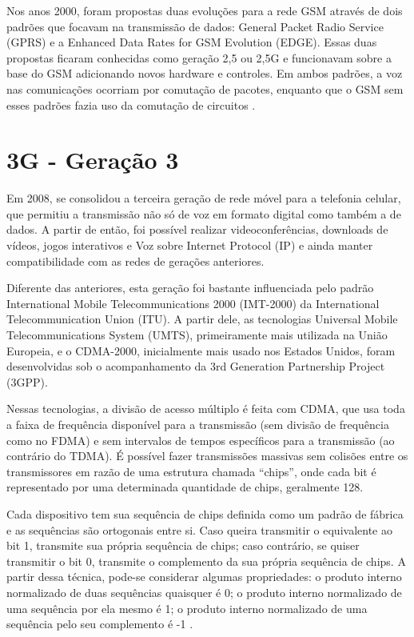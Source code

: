\documentclass[11pt,oneside,a4paper]{abntex2}
\begin{document}
Nos anos 2000, foram propostas duas evoluções para a rede GSM através de dois padrões que focavam na transmissão de dados: General Packet Radio Service (GPRS) e a Enhanced Data Rates for GSM Evolution (EDGE). Essas duas propostas ficaram conhecidas como geração 2,5 ou 2,5G e funcionavam sobre a base do GSM adicionando novos hardware e controles. Em ambos padrões, a voz nas comunicações ocorriam por comutação de pacotes, enquanto que o GSM sem esses padrões fazia uso da comutação de circuitos \cite{tcc2}.

\section*{3G - Geração 3}
\label{3g}

Em 2008, se consolidou a terceira geração de rede móvel para a telefonia celular, que permitiu a transmissão não só de voz em formato digital como também a de dados. A partir de então, foi possível realizar videoconferências, downloads de vídeos, jogos interativos e Voz sobre Internet Protocol (IP) \cite{tcc1} e ainda manter compatibilidade com as redes de gerações anteriores.

Diferente das anteriores, esta geração foi bastante influenciada pelo padrão International Mobile Telecommunications 2000 (IMT-2000) da International Telecommunication Union (ITU). A partir dele, as tecnologias Universal Mobile Telecommunications System (UMTS), primeiramente mais utilizada na União Europeia, e o CDMA-2000, inicialmente mais usado nos Estados Unidos, foram desenvolvidas sob o acompanhamento da 3rd Generation Partnership Project (3GPP).

Nessas tecnologias, a divisão de acesso múltiplo é feita com CDMA, que usa toda a faixa de frequência disponível para a transmissão (sem divisão de frequência como no FDMA) e sem intervalos de tempos específicos para a transmissão (ao contrário do TDMA). É possível fazer transmissões massivas sem colisões entre os transmissores em razão de  uma estrutura chamada ``chips'', onde cada bit é representado por uma determinada quantidade de chips, geralmente 128.

Cada dispositivo tem sua sequência de chips definida como um padrão de fábrica e as sequências são ortogonais entre si. Caso queira transmitir o equivalente ao bit 1, transmite sua própria sequência de chips; caso contrário, se quiser transmitir o bit 0, transmite o complemento da sua própria sequência de chips. A partir dessa técnica, pode-se considerar algumas propriedades: o produto interno normalizado de duas sequências quaisquer é 0; o produto interno normalizado de uma sequência por ela mesmo é 1; o produto interno normalizado de uma sequência pelo seu complemento é -1 \cite{aula4}.
\end{document}
